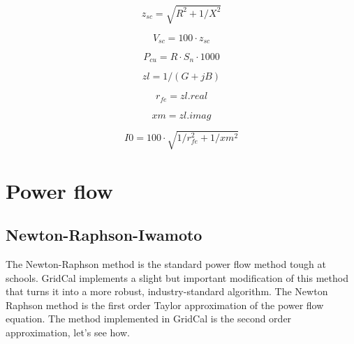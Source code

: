 \documentclass[11pt,fleqn]{book} %
\begin{document}
%
%
%

\begin{equation}
z_{sc} = \sqrt{R^2 + 1 / X^2}
\end{equation}


\begin{equation}
V_{sc} = 100 \cdot z_{sc}
\end{equation}

\begin{equation}
P_{cu} = R \cdot S_n \cdot 1000
\end{equation}

\begin{equation}
zl = 1 / (G + j B)
\end{equation}

\begin{equation}
r_{fe} = zl.real
\end{equation}

\begin{equation}
xm = zl.imag
\end{equation}

\begin{equation}
I0 = 100 \cdot \sqrt{1 / r_{fe}^2 + 1 / xm^2}
\end{equation}




\chapter{Power flow}

\section{Newton-Raphson-Iwamoto}

The Newton-Raphson method is the standard power flow method tough at schools. GridCal implements a slight but important modification of this method that turns it into a more robust, industry-standard algorithm. The Newton Raphson method is the first order Taylor approximation of the power flow equation. The method implemented in GridCal is the second order approximation, let's see how.
\end{document}
